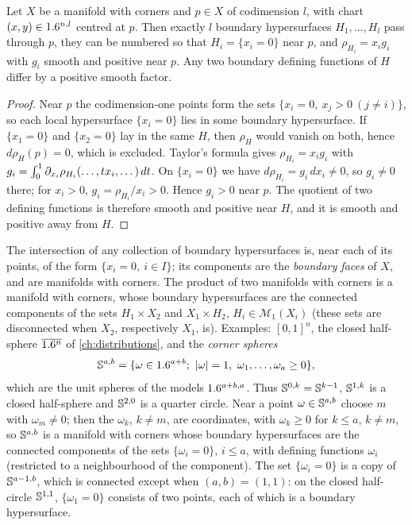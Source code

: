\begin{lemma}\label{blowup:lem:bdf}
Let $X$ be a manifold with corners and $p\in X$ of codimension $l$, with chart
$(x,y)\in1.6^{n,l}$ centred at $p$. Then exactly $l$ boundary hypersurfaces
$H_1,\dots,H_l$ pass through $p$, they can be numbered so that $H_i=\{x_i=0\}$ near
$p$, and $\rho_{H_i}=x_ig_i$ with $g_i$ smooth and positive near $p$. Any two boundary
defining functions of $H$ differ by a positive smooth factor.
\end{lemma}
\begin{proof}
Near $p$ the codimension-one points form the sets $\{x_i=0,\ x_j>0\ (j\ne i)\}$, so each
local hypersurface $\{x_i=0\}$ lies in some boundary hypersurface. If $\{x_1=0\}$ and
$\{x_2=0\}$ lay in the same $H$, then $\rho_H$ would vanish on both, hence
$d\rho_H(p)=0$, which is excluded. Taylor's formula gives $\rho_{H_i}=x_ig_i$ with
$g_i=\int_0^1\partial_{x_i}\rho_{H_i}(\dots,tx_i,\dots)\,dt$. On $\{x_i=0\}$ we have
$d\rho_{H_i}=g_i\,dx_i\neq0$, so $g_i\ne0$ there; for $x_i>0$, $g_i=\rho_{H_i}/x_i>0$.
Hence $g_i>0$ near $p$. The quotient of two defining functions is therefore smooth and
positive near $H$, and it is smooth and positive away from $H$.
\end{proof}

The intersection of any collection of boundary hypersurfaces is, near each of its
points, of the form $\{x_i=0,\ i\in I\}$; its components are the \emph{boundary faces}
of $X$, and are manifolds with corners. The product of two manifolds with corners is a
manifold with corners, whose boundary hypersurfaces are the connected components of
the sets $H_1\times X_2$ and $X_1\times H_2$, $H_i\in\mathcal M_1(X_i)$ (these sets are
disconnected when $X_2$, respectively $X_1$, is).
Examples: $[0,1]^n$, the closed half-sphere $\overline{1.6^n}$ of \cref{ch:distributions},
and the \emph{corner spheres}
\begin{equation*}
  \Sphere^{a,b}=\{\omega\in\R^{a+b};\ \abs\omega=1,\ \omega_1,\dots,\omega_a\ge0\},
\end{equation*}
which are the unit spheres of the models $1.6^{a+b,a}$. Thus $\mathbb{S}^{0,k}=\mathbb{S}^{k-1}$,
$\mathbb{S}^{1,k}$ is a closed half-sphere and $\mathbb{S}^{2,0}$ is a quarter circle. Near a
point $\omega\in\mathbb{S}^{a,b}$ choose $m$ with $\omega_m\ne0$; then the
$\omega_k$, $k\ne m$, are coordinates, with $\omega_k\ge0$ for $k\le a$, $k\neq m$, so
$\mathbb{S}^{a,b}$ is a manifold with corners whose boundary hypersurfaces are the
connected components of the sets $\{\omega_i=0\}$, $i\le a$, with defining functions
$\omega_i$ (restricted to a neighbourhood of the component). The set $\{\omega_i=0\}$ is a
copy of $\mathbb{S}^{a-1,b}$, which is connected except when $(a,b)=(1,1)$: on the closed
half-circle $\mathbb{S}^{1,1}$, $\{\omega_1=0\}$ consists of two points, each of which is a
boundary hypersurface.

